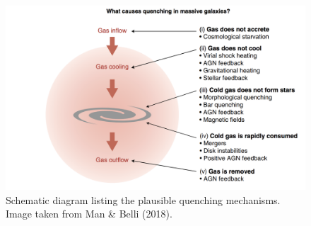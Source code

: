 \documentclass[a4paper,11pt]{article}
\begin{document}
\begin{figure}[t]
    \centering
    \includegraphics[width=16cm]{figures/quenching.png}
    \caption{\footnotesize{Schematic diagram listing the plausible quenching mechanisms. Image taken from Man \& Belli (2018).}}
    \label{fig:quenching}
\end{figure}
\end{document}
